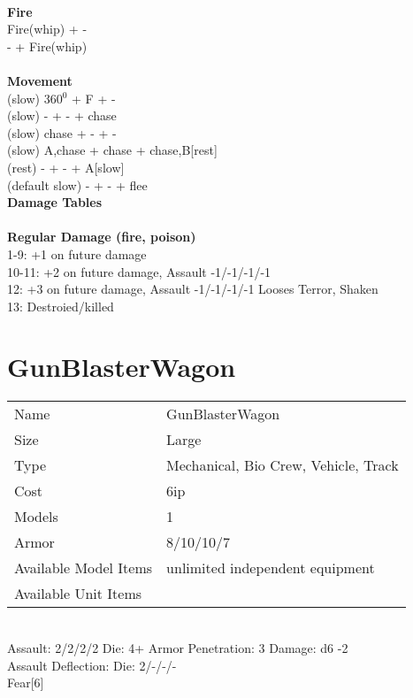 \ \\ {\bf Fire } \\
Fire(whip) + - \\
- + Fire(whip) \\
\ \\ {\bf Movement } \\
(slow) 360$^0$ + F + - \\
(slow) - + - + chase \\
(slow) chase + - + - \\
(slow) A,chase + chase + chase,B[rest] \\
(rest) - + - + A[slow] \\
(default slow) - + - + flee \\



{\bf Damage Tables} \\
\ \\ {\bf Regular Damage (fire, poison) } \\
1-9: +1 on future damage \\
10-11: +2 on future damage, Assault -1/-1/-1/-1 \\
12: +3 on future damage, Assault -1/-1/-1/-1 Looses Terror, Shaken \\
13: Destroied/killed \\









\pagebreak

\section{ GunBlasterWagon }

\begin{tabular}{ll}
  Name & GunBlasterWagon \\
  Size & Large\\
  Type & Mechanical, Bio Crew, Vehicle, Track\\
  Cost & 6ip\\
  Models & 1\\
  Armor & 8/10/10/7\\
  Available Model Items & unlimited independent equipment \\
  Available Unit Items &  \\
\end{tabular}

\ \\
Assault: 2/2/2/2 Die: 4+ Armor Penetration: 3 Damage: d6 -2 \\
Assault Deflection:  Die: 2/-/-/-\\
\indent Fear[6] \\
\ \\

